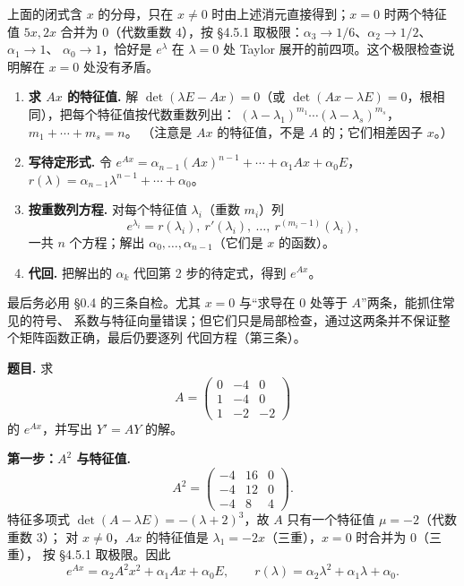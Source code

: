 \documentclass[11pt]{ctexart}
\newcommand{\pmat}[1]{\begin{pmatrix}#1\end{pmatrix}}
\newcommand{\Ax}{Ax}
\begin{document}
上面的闭式含 $x$ 的分母，只在 $x\ne0$ 时由上述消元直接得到；$x=0$ 时两个特征值 $5x,2x$ 合并为
$0$（代数重数 $4$），按 §4.5.1 取极限：$\alpha_3\to1/6$、$\alpha_2\to1/2$、$\alpha_1\to1$、
$\alpha_0\to1$，恰好是 $e^{\lambda}$ 在 $\lambda=0$ 处 Taylor 展开的前四项。这个极限检查说明解在
$x=0$ 处没有矛盾。


\begin{enumerate}
  \item \textbf{求 $\Ax$ 的特征值.} 解 $\det(\lambda E-\Ax)=0$（或 $\det(\Ax-\lambda E)=0$，根相同），把每个特征值按代数重数列出：
        $(\lambda-\lambda_1)^{m_1}\cdots(\lambda-\lambda_s)^{m_s}$，$m_1+\cdots+m_s=n$。
        （注意是 $\Ax$ 的特征值，不是 $A$ 的；它们相差因子 $x$。）
  \item \textbf{写待定形式.} 令
        $e^{Ax}=\alpha_{n-1}(\Ax)^{n-1}+\cdots+\alpha_1\Ax+\alpha_0E$，
        $r(\lambda)=\alpha_{n-1}\lambda^{n-1}+\cdots+\alpha_0$。
  \item \textbf{按重数列方程.} 对每个特征值 $\lambda_i$（重数 $m_i$）列
        \[
        e^{\lambda_i}=r(\lambda_i),\ r'(\lambda_i),\ \dots,\ r^{(m_i-1)}(\lambda_i),
        \]
        一共 $n$ 个方程；解出 $\alpha_0,\dots,\alpha_{n-1}$（它们是 $x$ 的函数）。
  \item \textbf{代回.} 把解出的 $\alpha_k$ 代回第 2 步的待定式，得到 $e^{Ax}$。
\end{enumerate}
最后务必用 §0.4 的三条自检。尤其 $x=0$ 与“求导在 $0$ 处等于 $A$”两条，能抓住常见的符号、
系数与特征向量错误；但它们只是局部检查，通过这两条并不保证整个矩阵函数正确，最后仍要逐列
代回方程（第三条）。


\textbf{题目.} 求
\[
A=\pmat{0&-4&0\\1&-4&0\\1&-2&-2}
\]
的 $e^{Ax}$，并写出 $Y'=AY$ 的解。

\textbf{第一步：$A^2$ 与特征值.}
\[
A^2=\pmat{-4&16&0\\-4&12&0\\-4&8&4}.
\]
特征多项式 $\det(A-\lambda E)=-(\lambda+2)^3$，故 $A$ 只有一个特征值 $\mu=-2$（代数重数 3）；
对 $x\ne0$，$\Ax$ 的特征值是 $\lambda_1=-2x$（三重），$x=0$ 时合并为 $0$（三重），
按 §4.5.1 取极限。因此
\[
e^{Ax}=\alpha_2A^2x^2+\alpha_1\Ax+\alpha_0E,\qquad
r(\lambda)=\alpha_2\lambda^2+\alpha_1\lambda+\alpha_0 .
\]
\end{document}
